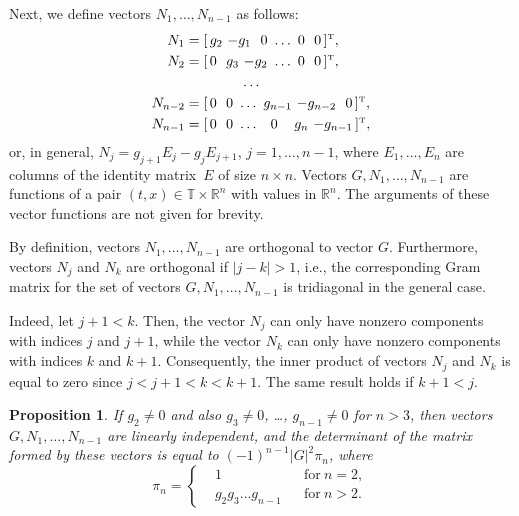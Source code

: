 \documentclass[10pt,reqno]{amsart}
\newcommand{\trans}{{\scriptscriptstyle \mathrm{T}}}
\theoremstyle{plain}
\newtheorem{Proposition}{Proposition}
\theoremstyle{remark}
\begin{document}
Next, we define vectors $N_1,\dots,N_{n-1}$ as follows:
\begin{equation}\label{eqBasisX}
  \begin{aligned}
    N_1 & = [ \, g_2 ~ {-g_1} \ \ 0 ~ \dots ~ 0 \ \ 0 \, ]^\trans, \\
    N_2 & = [ \, 0 \ \ g_3 ~ {-g_2} ~ \dots ~ 0 \ \ 0 \, ]^\trans, \\
    & \hskip 4em \dots \\
    N_{n-2} & = [ \, 0 \ \ 0 ~ \dots ~ g_{n-1} ~ {-g_{n-2}} \ \ 0 \, ]^\trans, \\
    N_{n-1} & = [ \, 0 \ \ 0 ~ \dots ~ \hskip 0.52em 0 \hskip 0.52em \ \ g_n ~ {-g_{n-1}} \, ]^\trans,
  \end{aligned}
\end{equation}
or, in general, $N_j = g_{j+1} E_j - g_j E_{j+1}$, $j = 1,\dots,n-1$, where $E_1,\dots,E_n$ are columns of the identity matrix~$E$ of size $n \times n$. Vectors $G,N_1,\dots,N_{n-1}$ are functions of a pair $(t,x) \in \mathds{T} \times \mathds{R}^n$ with values in $\mathds{R}^n$. The arguments of these vector functions are not given for brevity.

By definition, vectors $N_1,\dots,N_{n-1}$ are orthogonal to vector $G$. Furthermore, vectors $N_j$ and $N_k$ are orthogonal if $|j - k| > 1$, i.e., the corresponding Gram matrix for the set of vectors $G,N_1,\dots,N_{n-1}$ is tridiagonal in the general case.

Indeed, let $j + 1 < k$. Then, the vector $N_j$ can only have nonzero components with indices $j$ and $j + 1$, while the vector $N_k$ can only have nonzero components with indices $k$ and $k + 1$. Consequently, the inner product of vectors $N_j$ and $N_k$ is equal to zero since $j < j + 1 < k < k + 1$. The same result holds if $k + 1 < j$.

\begin{Proposition}\label{prop1}
If $g_2 \neq 0$ and also $g_3 \neq 0$, \dots, $g_{n-1} \neq 0$ for $n > 3$, then vectors $G,N_1,\dots,N_{n-1}$ are linearly independent, and the determinant of the matrix formed by these vectors is equal to $(-1)^{n-1} |G|^2 \pi_n$, where
\begin{equation}\label{eqDefPi}
  \pi_n = \left\{ \begin{aligned}
    & 1 & & \text{for} ~ n = 2, \\
    & g_2 g_3 \dots g_{n-1} & & \text{for} ~ n > 2.
  \end{aligned} \right.
\end{equation}
\end{Proposition}
\end{document}
